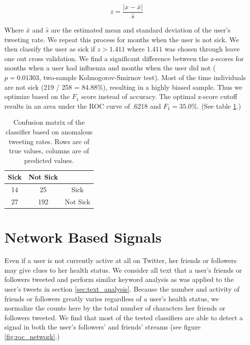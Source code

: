 \documentclass{acm_proc_article-sp}
\begin{document}
\begin{equation}
z = \frac{|x - \bar{x}|}{\hat{s}}
\end{equation}

Where \(\bar{x}\) and \(\hat{s}\) are the estimated mean and standard deviation of the user's tweeting rate. \cite{Grubs:1969ab} We repeat this process for months when the user is not sick. We then classify the user as sick if \(z > 1.411\) where \(1.411\) was chosen through leave one out cross validation. We find a significant difference between the z-scores for months when a user had influenza and months when the user did not (\(p = 0.01303\), two-sample Kolmogorov-Smirnov test). Most of the time individuals are not sick (219 / 258 = 84.88\%), resulting in a highly biased sample. Thus we optimize based on the \(F_1\) score instead of accuracy. The optimal z-score cutoff results in  an area under the ROC curve of .6218 and \(F_1= 35.0\%\). (See table \ref{tab:tweet_anomaly_confusion}.) 


\begin{table}
\centering
\begin{tabular}{|c|c|c|} \hline
Sick&Not Sick&\ \\ \hline
14 & 25 & Sick\\ \hline
27 & 192 & Not Sick\\
\hline\end{tabular}
\caption{Confusion matrix of the classifier based on anomalous tweeting rates. Rows are of true values, columns are of predicted values.}
\label{tab:tweet_anomaly_confusion}
\end{table}

\section{Network Based Signals}

Even if a user is not currently active at all on Twitter, her friends or followers may give clues to her health status. We consider all text that a user's friends or followers tweeted and perform similar keyword analysis as was applied to the user's tweets in section \ref{sec:text_analysis}. Because the number and activity of friends or followers greatly varies regardless of a user's health status, we normalize the counts here by the total number of characters her friends or followers tweeted. We find that most of the tested classifiers are able to detect a signal in both the user's followers' and friends' streams (see figure \ref{fig:roc_network}.)
\end{document}
